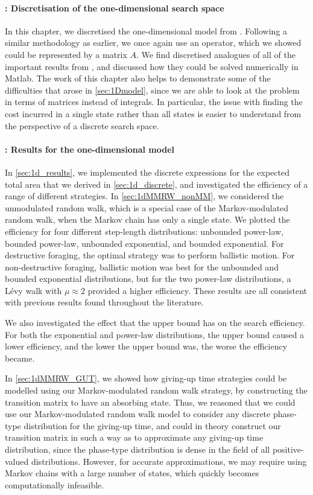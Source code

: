 \paragraph{: Discretisation of the one-dimensional search space}
In this chapter, we discretised the one-dimensional model from . Following a similar methodology as earlier, we once again use an operator, which we showed could be represented by a matrix $A$. We find discretised analogues of all of the important results from , and discussed how they could be solved numerically in Matlab. The work of this chapter also helps to demonstrate some of the difficulties that arose in \cref{sec:1Dmodel}, since we are able to look at the problem in terms of matrices instead of integrals. In particular, the issue with finding the cost incurred in a single state rather than all states is easier to understand from the perspective of a discrete search space.


\paragraph{: Results for the one-dimensional model}
In \cref{sec:1d_results}, we implemented the discrete expressions for the expected total area that we derived in \cref{sec:1d_discrete}, and investigated the efficiency of a range of different strategies. 
In \cref{sec:1dMMRW_nonMM}, we considered the unmodulated random walk, which is a special case of the Markov-modulated random walk, when the Markov chain has only a single state. We plotted the efficiency for four different step-length distributions: unbounded power-law, bounded power-law, unbounded exponential, and bounded exponential. For destructive foraging, the optimal strategy was to perform ballistic motion. For non-destructive foraging, ballistic motion was best for the unbounded and bounded exponential distributions, but for the two power-law distributions, a L\'{e}vy walk with $\mu \approx 2$ provided a higher efficiency. These results are all consistent with previous results found throughout the literature. 

We also investigated the effect that the upper bound has on the search efficiency. For both the exponential and power-law distributions, the upper bound caused a lower efficiency, and the lower the upper bound was, the worse the efficiency became.

In \cref{sec:1dMMRW_GUT}, we showed how giving-up time strategies could be modelled using our Markov-modulated random walk strategy, by constructing the transition matrix to have an absorbing state. Thus, we reasoned that we could use our Markov-modulated random walk model to consider any discrete phase-type distribution for the giving-up time, and could in theory construct our transition matrix in such a way as to approximate any giving-up time distribution, since the phase-type distribution is dense in the field of all positive-valued distributions. However, for accurate approximations, we may require using Markov chains with a large number of states, which quickly becomes computationally infeasible.


